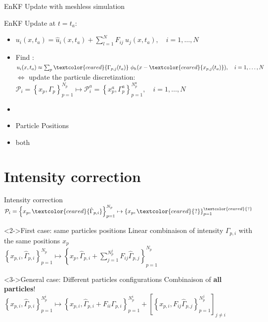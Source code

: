 \documentclass[aspectratio=169]{beamer} %
\begin{document}
\begin{frame}{EnKF Update with meshless simulation}
    \begin{block}{EnKF Update at $t=t_a$:}
        \begin{itemize}
            \item $u_i(x, t_a) = \hat u_i(x, t_a) + \sum_{l=1}^{N} F_{ij}~\hat u_j(x, t_a), \quad i = 1, \dots, N$ \\
            \item<2-> Find : $u_i(x, t_a) \approx \sum_p \textcolor{ceared}{\Gamma_{p, j}(t_a)}~\phi_h (x - \textcolor{ceared}{x_{p, j}(t_a)}), \quad i = 1, \dots, N$\\
                $\Leftrightarrow$ update the particule discretization: $\mathcal P_i = \left\{x_p, \Gamma_p\right\}_{p=1}^{N_p} \mapsto \mathcal P_i^a = \left\{x_p^a, \Gamma^a_p\right\}_{p=1}^{N^a_p}, \quad i = 1, \dots, N$
        \end{itemize}
    \end{block}
    \vfill

    \begin{itemize}
        \item<3->   
        \item<3-> Particle Positions
        \item<3-> both
    \end{itemize}
\end{frame}

\section{Intensity correction}
\begin{frame}{Intensity correction}
    $\mathcal{P}_i = \left\{x_p, \textcolor{ceared}{\hat \Gamma_{p, i}}\right\}_{p=1}^{N_p} \mapsto \left\{x_p, \textcolor{ceared}{?} \right\}_{p=1}^{\textcolor{ceared}{?}}$

    \begin{block}<2->{First case: same particles positions}
        Linear combinaison of intensity $\Gamma_{p,i}$ with the same positions $x_p$\\
        $\left\{x_{p,i}, \hat \Gamma_{p,i}\right\}_{p=1}^{N_p} \mapsto \left\{x_p, \hat \Gamma_{p, i} + \sum_{j=1}^{N_p^j} F_{ij} \hat \Gamma_{p,j} \right\}_{p=1}^{N_p}$
    \end{block}

    \begin{block}<3->{General case: Different particles configurations}
        Combinaison of \textbf{all particles}! \\
        $ \left\{x_{p,i}, \hat \Gamma_{p,i}\right\}_{p=1}^{N^i_p} \mapsto \left\{x_{p,i}, \hat \Gamma_{p,i} + F_{ii}\Gamma_{p,i} \right\}_{p=1}^{N_p^i} + \left[\left\{x_{p,i}, F_{ij} \hat \Gamma_{p,j}\right\}_{p=1}^{N_p^j}\right]_{j\neq i}$ \\
    \end{block}
\end{frame}
\end{document}
